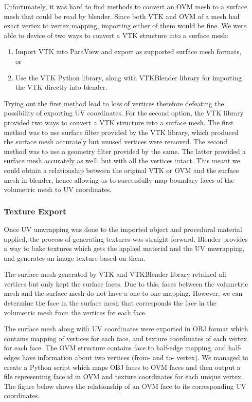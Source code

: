 Unfortunately, it was hard to find methods to convert an OVM mesh to a surface mesh that could be read by blender. Since both VTK and OVM of a mesh had exact vertex to vertex mapping, importing either of them would be fine. We were able to device of two ways to convert a VTK structure into a surface mesh:

\begin{enumerate}[1.]
  \item Import VTK into ParaView and export as supported surface mesh formats, or
  \item Use the VTK Python library, along with VTKBlender library for importing the VTK directly into blender.
\end{enumerate}

Trying out the first method lead to loss of vertices therefore defeating the possibility of exporting UV coordinates. For the second option, the VTK library provided two ways to convert a VTK structure into a surface mesh. The first method was to use surface filter provided by the VTK library, which produced the surface mesh accurately but unused vertices were removed. The second method was to use a geometry filter provided by the same. The latter provided a surface mesh accurately as well, but with all the vertices intact. This meant we could obtain a relationship between the original VTK or OVM and the surface mesh in blender, hence allowing us to successfully map boundary faces of the volumetric mesh to UV coordinates.

\subsubsection{Texture Export}
Once UV unwrapping was done to the imported object and procedural material applied, the process of generating textures was straight forward. Blender provides a way to bake textures which gets the applied material and the UV unwrapping, and generates an image texture based on them.

The surface mesh generated by VTK and VTKBlender library retained all vertices but only kept the surface faces. Due to this, faces between the volumetric mesh and the surface mesh do not have a one to one mapping. However, we can determine the face in the surface mesh that corresponds the face in the volumetric mesh from the vertices for each face.

The surface mesh along with UV coordinates were exported in OBJ format which contains mapping of vertices for each face, and texture coordinates of each vertex for each face. The OVM structure contains face to half-edge mapping, and half-edges have information about two vertices (from- and to- vertex). We managed to create a Python script which maps OBJ faces to OVM faces and then output a file representing face id in OVM and texture coordinates for each unique vertex. The figure below shows the relationship of an OVM face to its corresponding UV coordinates.

